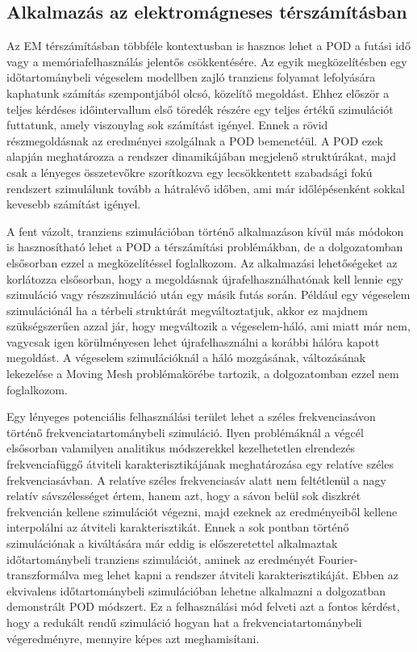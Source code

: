         \subsection{Alkalmazás az elektromágneses térszámításban}
            \label{sec:empod}
            Az EM térszámításban többféle kontextusban is hasznos lehet a POD a futási idő  vagy a memóriafelhasználás jelentős csökkentésére. Az egyik megközelítésben egy időtartománybeli végeselem modellben zajló tranziens folyamat lefolyására kaphatunk számítás szempontjából olcsó, közelítő megoldást. Ehhez először a teljes kérdéses időintervallum első töredék részére egy teljes értékű szimulációt futtatunk, amely viszonylag sok számítást igényel. Ennek a rövid részmegoldásnak az eredményei szolgálnak a POD bemenetéül. A POD ezek alapján meghatározza a rendszer dinamikájában megjelenő struktúrákat, majd csak a lényeges összetevőkre szorítkozva egy lecsökkentett szabadsági fokú rendszert szimulálunk tovább a hátralévő időben, ami már időlépésenként sokkal kevesebb számítást igényel.
            \par
            A fent vázolt, tranziens szimulációban történő alkalmazáson kívül más módokon is hasznosítható lehet a POD a térszámítási problémákban, de a dolgozatomban elsősorban ezzel a megközelítéssel foglalkozom. Az alkalmazási lehetőségeket az korlátozza elsősorban, hogy a megoldásnak újrafelhasználhatónak kell lennie egy szimuláció vagy részszimuláció után egy másik futás során. Például egy végeselem szimulációnál ha a térbeli struktúrát megváltoztatjuk, akkor ez majdnem szükségszerűen azzal jár, hogy megváltozik a végeselem-háló, ami miatt már nem, vagycsak igen körülményesen lehet újrafelhasználni a korábbi hálóra kapott megoldást. A végeselem szimulációknál a háló mozgásának, változásának lekezelése a Moving Mesh problémakörébe tartozik, a dolgozatomban ezzel nem foglalkozom.
            \par
            Egy lényeges potenciális felhasználási terület lehet a széles frekvenciasávon történő frekvenciatartománybeli szimuláció. Ilyen problémáknál a végcél elsősorban valamilyen analitikus módszerekkel kezelhetetlen elrendezés frekvenciafüggő átviteli karakterisztikájának meghatározása egy relatíve széles frekvenciasávban. A relatíve széles frekvenciasáv alatt nem feltétlenül a nagy relatív sávszélességet értem, hanem azt, hogy a sávon belül sok diszkrét frekvencián kellene szimulációt végezni, majd ezeknek az eredményeiből kellene interpolálni az átviteli karakterisztikát. Ennek a sok pontban történő szimulációnak a kiváltására már eddig is előszeretettel alkalmaztak időtartománybeli tranziens szimulációt, aminek az eredményét Fourier-transzformálva meg lehet kapni a rendszer átviteli karakterisztikáját. Ebben az ekvivalens időtartománybeli szimulációban lehetne alkalmazni a dolgozatban demonstrált POD módszert. Ez a felhasználási mód felveti azt a fontos kérdést, hogy a redukált rendű szimuláció hogyan hat a frekvenciatartománybeli végeredményre, mennyire képes azt meghamisítani.

